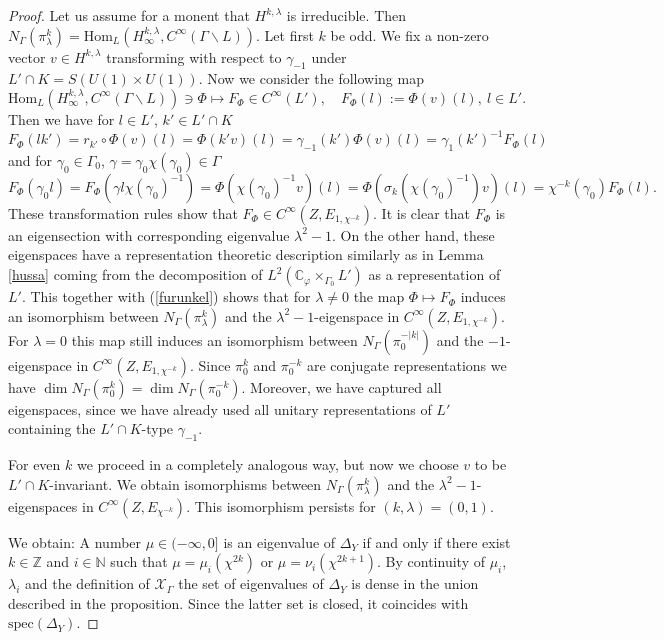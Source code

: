 \documentclass[10]{amsart}
\theoremstyle{remark}
\theoremstyle{definition}
\numberwithin{equation}{section}
\newcommand{\C}{\mathbb{C}}           %
\newcommand{\N}{\mathbb{N}}           %
\newcommand{\Z}{\mathbb{Z}}         %
\newcommand{\Hom}{\mathrm{Hom}}
\newcommand{\spec}{{\mathrm{spec}}}
\newcommand{\vp}{\varphi}
\newcommand{\Cal}{\mathcal}
\begin{document}
{\begin{proof}
Let us assume for a monent that $H^{k,\lambda}$ is irreducible. Then $N_\Gamma(\pi^k_\lambda)=\Hom_L(H^{k,\lambda}_\infty,C^\infty(\Gamma\backslash L))$.
Let first $k$ be odd. We fix a non-zero vector $v\in H^{k,\lambda}$ transforming with respect to $\gamma_{-1}$
under $L'\cap K=S(U(1)\times U(1))$. Now we consider the following map
$$ \Hom_L(H^{k,\lambda}_\infty,C^\infty(\Gamma\backslash L))\ni\Phi\mapsto F_\Phi\in C^\infty(L'),\quad F_\Phi(l):=\Phi(v)(l),\ l\in L'.$$ 
Then we have for $l\in L'$, $k'\in L'\cap K$
$$ F_\Phi(lk')=r_{k'}\circ \Phi(v)(l)=\Phi(k'v)(l)=\gamma_{-1}(k') \Phi(v)(l)=\gamma_1(k')^{-1}F_\Phi(l)$$
and for $\gamma_0\in\Gamma_0$, $\gamma=\gamma_0\chi(\gamma_0)\in \Gamma$
$$ F_\Phi (\gamma_0l)=F_\Phi(\gamma l\chi(\gamma_0)^{-1})=\Phi(\chi(\gamma_0)^{-1}v)(l)=\Phi(\sigma_k(\chi(\gamma_0)^{-1})v)(l)=\chi^{-k}(\gamma_0)F_\Phi(l).$$
These transformation rules show that $F_\Phi\in C^\infty(Z, E_{1,\chi^{-k}})$. It is clear that $F_\Phi$ is an eigensection with corresponding eigenvalue $\lambda^2-1$.
On the other hand, these eigenspaces have a representation theoretic description similarly as in Lemma \ref{hussa} coming from the decomposition of $L^2(\C_\vp\times_{\Gamma_0} L')$ as a representation of $L'$. This together with (\ref{furunkel}) shows that for $\lambda\ne 0$ the map $\Phi\mapsto F_\Phi$ induces an isomorphism
between $N_\Gamma(\pi^k_\lambda)$ and the $\lambda^2-1$-eigenspace in $C^\infty(Z, E_{1,\chi^{-k}})$.
For $\lambda=0$ this map still induces an isomorphism between $N_\Gamma(\pi^{-|k|}_0)$ and the $-1$-eigenspace in $C^\infty(Z, E_{1,\chi^{-k}})$.
Since $\pi^k_0$ and $\pi^{-k}_0$ are conjugate representations we have $\dim N_\Gamma(\pi^{k}_0)=\dim N_\Gamma(\pi^{-k}_0)$.
Moreover, we have captured all eigenspaces, since we have already used all unitary representations of $L'$  containing the $L'\cap K$-type $\gamma_{-1}$.

For even $k$ we proceed in a completely analogous way, but now we choose $v$ to be $L'\cap K$-invariant. We obtain isomorphisms between $N_\Gamma(\pi^k_\lambda)$ and the $\lambda^2-1$-eigenspaces in $C^\infty(Z, E_{\chi^{-k}})$. This isomorphism persists for $(k,\lambda)=(0,1)$.

We obtain: A number $\mu\in (-\infty,0]$ is an eigenvalue of $\Delta_Y$ if and only if there exist $k\in\Z$ and $i\in\N$ such that
$\mu=\mu_i(\chi^{2k})$ or $\mu=\nu_i(\chi^{2k+1})$. By continuity of $\mu_i$, $\lambda_i$ and the definition of ${\Cal X}_\Gamma$ the set of eigenvalues of $\Delta_Y$ is dense in the union described in the proposition. Since the latter set is closed, it coincides with $\spec(\Delta_Y)$.
\end{proof}

}
\end{document}
